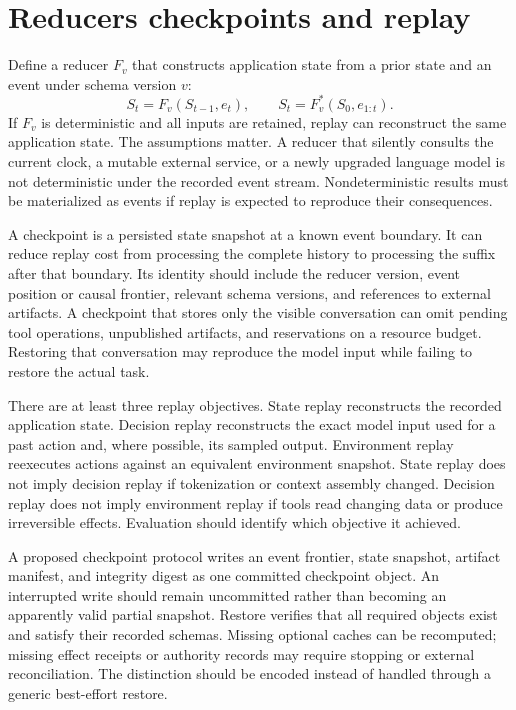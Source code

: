 \section{Reducers checkpoints and replay}\label{sec:C13:replay}
Define a reducer $F_v$ that constructs application state from a prior state and an event under schema version $v$:
\begin{equation}
 S_t=F_v(S_{t-1},e_t),\qquad
 S_t=F_v^{*}(S_0,e_{1:t}).
\end{equation}
If $F_v$ is deterministic and all inputs are retained, replay can reconstruct the same application state. The assumptions matter. A reducer that silently consults the current clock, a mutable external service, or a newly upgraded language model is not deterministic under the recorded event stream. Nondeterministic results must be materialized as events if replay is expected to reproduce their consequences.

A checkpoint is a persisted state snapshot at a known event boundary. It can reduce replay cost from processing the complete history to processing the suffix after that boundary. Its identity should include the reducer version, event position or causal frontier, relevant schema versions, and references to external artifacts. A checkpoint that stores only the visible conversation can omit pending tool operations, unpublished artifacts, and reservations on a resource budget. Restoring that conversation may reproduce the model input while failing to restore the actual task.

There are at least three replay objectives. State replay reconstructs the recorded application state. Decision replay reconstructs the exact model input used for a past action and, where possible, its sampled output. Environment replay reexecutes actions against an equivalent environment snapshot. State replay does not imply decision replay if tokenization or context assembly changed. Decision replay does not imply environment replay if tools read changing data or produce irreversible effects. Evaluation should identify which objective it achieved.

A proposed checkpoint protocol writes an event frontier, state snapshot, artifact manifest, and integrity digest as one committed checkpoint object. An interrupted write should remain uncommitted rather than becoming an apparently valid partial snapshot. Restore verifies that all required objects exist and satisfy their recorded schemas. Missing optional caches can be recomputed; missing effect receipts or authority records may require stopping or external reconciliation. The distinction should be encoded instead of handled through a generic best-effort restore.

